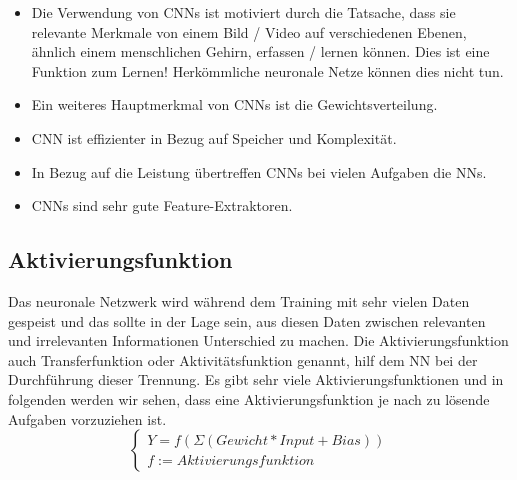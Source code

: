 \documentclass[12pt,a4paper]{scrartcl}
\numberwithin{equation}{section}
\begin{document}
\begin{itemize}
	\item Die Verwendung von CNNs ist motiviert durch die Tatsache, dass sie relevante Merkmale von einem Bild / Video auf verschiedenen Ebenen, ähnlich einem menschlichen Gehirn, erfassen / lernen können. Dies ist eine Funktion zum Lernen! Herkömmliche neuronale Netze können dies nicht tun.
	\item Ein weiteres Hauptmerkmal von CNNs ist die Gewichtsverteilung.
	\item CNN ist effizienter in Bezug auf Speicher und Komplexität.
	\item In Bezug auf die Leistung übertreffen CNNs bei vielen Aufgaben die NNs. 
	\item CNNs sind sehr gute Feature-Extraktoren.
\end{itemize}

\subsection{Aktivierungsfunktion}
Das neuronale Netzwerk wird während dem Training mit sehr vielen Daten gespeist und das sollte in der Lage sein, aus diesen Daten zwischen relevanten und irrelevanten Informationen Unterschied zu machen.
Die Aktivierungsfunktion auch Transferfunktion oder Aktivitätsfunktion genannt, hilf dem \ac{NN} bei der Durchführung dieser Trennung. Es gibt sehr viele Aktivierungsfunktionen und in folgenden werden wir sehen, dass eine Aktivierungsfunktion je nach zu lösende Aufgaben  vorzuziehen ist.\[\begin{cases}
Y = f(\Sigma (Gewicht*Input + Bias))\\ f:= Aktivierungsfunktion
\end{cases} \]
\end{document}
